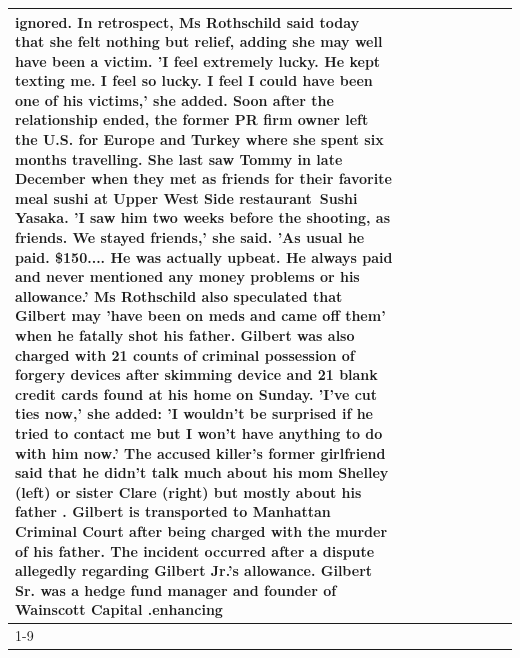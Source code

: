 \begin{table}[H]
\begin{tabular}{lllrlllll}
ignored. In retrospect, Ms Rothschild said today that she felt nothing but relief, adding she may well have been a victim. 'I feel extremely lucky. He kept texting me. I feel so lucky. I feel I could have been one of his victims,' she added. Soon after the relationship ended, the former PR firm owner left the U.S. for Europe and Turkey where she spent six months  travelling. She last saw Tommy in late December when they met as friends for their favorite meal sushi at Upper West Side restaurant Sushi Yasaka. 'I saw him two weeks before the shooting, as friends. We stayed friends,' she said. 'As usual he paid. \$150.... He was actually upbeat. He always paid and never mentioned any money problems or his allowance.' Ms Rothschild also speculated that Gilbert may 'have been on meds and came off them' when he fatally shot his father. Gilbert was also charged with 21 counts of criminal possession of forgery devices after skimming device and 21 blank credit cards found at his home on Sunday. 'I've cut ties now,' she added: 'I wouldn’t be surprised if he tried to contact me but I won’t have anything to do with him now.' The accused killer's former girlfriend said that he didn't talk much about his mom Shelley (left) or sister Clare (right) but mostly about his father . Gilbert is transported to Manhattan Criminal Court  after being charged with the murder of his father. The incident occurred after a dispute allegedly regarding Gilbert Jr.'s allowance. Gilbert Sr. was a hedge fund manager and founder of Wainscott Capital .enhancing \\
\cline{1-9}

\end{tabular}
\end{table}
